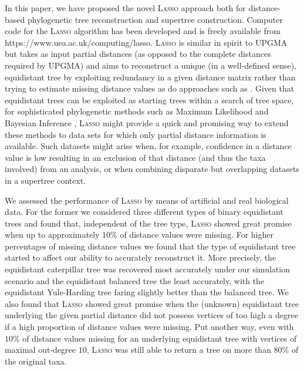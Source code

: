 In this paper, we have proposed the novel \textsc{Lasso} approach both for
distance-based phylogenetic tree reconstruction and supertree construction.
Computer code for the \textsc{Lasso} algorithm has been developed and is
freely available from https://www.uea.ac.uk/computing/lasso.  \textsc{Lasso}
is similar in spirit to \textsc{UPGMA} but takes as input partial distances
(as opposed to the complete distances required by \textsc{UPGMA}) and aims to
reconstruct a unique (in a well-defined sense), equidistant tree by exploiting
redundancy in a given distance matrix rather than trying to estimate missing
distance values as do approaches such as \cite{criscuolo2008fastnj}. Given
that equidistant trees can be exploited as starting trees within a search of
tree space, for sophisticated phylogenetic methods such as Maximum Likelihood
and Bayesian Inference \cite{burbrink09molecular,bouckaert14beast},
\textsc{Lasso} might provide a quick and promising way to extend these methods
to data sets for which only partial distance information is available. Such
datasets might arise when, for example, confidence in a distance value is low
resulting in an exclusion of that distance (and thus the taxa involved) from
an analysis, or when combining disparate but overlapping datasets in a
supertree context.

We assessed the performance of \textsc{Lasso} by means of artificial and real
biological data.  For the former we considered three different types of binary
equidistant trees and found that, independent of the tree type, \textsc{Lasso}
showed great promise when up to approximately $10\%$ of distance values were
missing.  For higher percentages of missing distance values we found that the
type of equidistant tree started to affect our ability to accurately
reconstruct it. More precisely, the equidistant caterpillar tree was recovered
most accurately under our simulation scenario and the equidistant balanced
tree the least accurately, with the equidistant Yule-Harding tree faring
slightly better than the balanced tree.  We also found that \textsc{Lasso}
showed great promise when the (unknown) equidistant tree underlying the given
partial distance did not possess vertices of too high a degree if a high
proportion of distance values were missing.  Put another way, even with $10\%$
of distance values missing for an underlying equidistant tree with vertices of
maximal out-degree $10$, \textsc{Lasso} was still able to return a tree on
more than $80\%$ of the original taxa.

